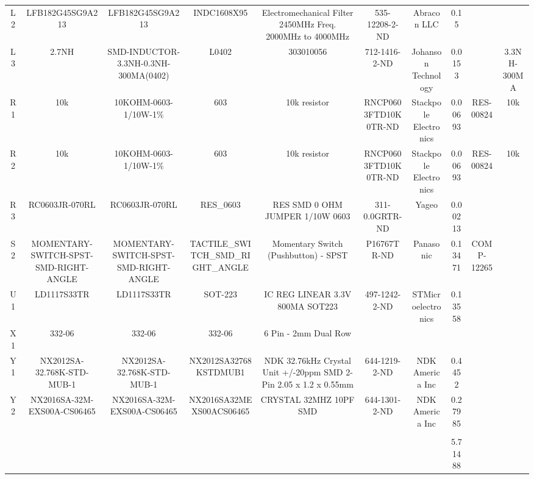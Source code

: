 \documentclass[12pt]{article}
\begin{document}
\begin{appendices}
\begin{table}[htb]
\begin{adjustbox}{angle=-90, scale=0.35, center}
\begin{tabular}{@{}cccccccccc@{}}
        L2 & LFB182G45SG9A213 & LFB182G45SG9A213 & INDC1608X95 & Electromechanical Filter 2450MHz Freq. 2000MHz to 4000MHz & 535-12208-2-ND & Abracon LLC & 0.15 &  &  \\
        L3 & 2.7NH & SMD-INDUCTOR-3.3NH-0.3NH-300MA(0402) & L0402 & 303010056 & 712-1416-2-ND & Johanson Technology & 0.0153 &  & 3.3NH- 300MA \\
        R1 & 10k & 10KOHM-0603-1/10W-1\% & 603 & 10k resistor & RNCP0603FTD10K0TR-ND & Stackpole Electronics & 0.00693 & RES-00824 & 10k \\
        R2 & 10k & 10KOHM-0603-1/10W-1\% & 603 & 10k resistor & RNCP0603FTD10K0TR-ND & Stackpole Electronics & 0.00693 & RES-00824 & 10k \\
        R3 & RC0603JR-070RL & RC0603JR-070RL & RES\_0603 & RES SMD 0 OHM JUMPER 1/10W 0603 & 311-0.0GRTR-ND & Yageo & 0.00213 &  &  \\
        S2 & MOMENTARY-SWITCH-SPST-SMD-RIGHT-ANGLE & MOMENTARY-SWITCH-SPST-SMD-RIGHT-ANGLE & TACTILE\_SWITCH\_SMD\_RIGHT\_ANGLE & Momentary Switch (Pushbutton) - SPST & P16767TR-ND & Panasonic & 0.13471 & COMP-12265 &  \\
        U1 & LD1117S33TR & LD1117S33TR & SOT-223 & IC REG LINEAR 3.3V 800MA SOT223 & 497-1242-2-ND & STMicroelectronics & 0.13558 &  &  \\
        X1 & 332-06 & 332-06 & 332-06 & 6 Pin - 2mm Dual Row &  &  &  &  &  \\
        Y1 & NX2012SA-32.768K-STD-MUB-1 & NX2012SA-32.768K-STD-MUB-1 & NX2012SA32768KSTDMUB1 & NDK 32.76kHz Crystal Unit +/-20ppm SMD 2-Pin 2.05 x 1.2 x 0.55mm & 644-1219-2-ND & NDK America Inc & 0.4452 &  &  \\
        Y2 & NX2016SA-32M-EXS00A-CS06465 & NX2016SA-32M-EXS00A-CS06465 & NX2016SA32MEXS00ACS06465 & CRYSTAL 32MHZ 10PF SMD & 644-1301-2-ND & NDK America Inc & 0.27985 &  &  \\
         &  &  &  &  &  &  &  &  &  \\
         &  &  &  &  &  &  & 5.71488 &  &  \\
        \bottomrule
    \end{tabular}
    \end{adjustbox}
\end{table}


\end{appendices}
\end{document}
